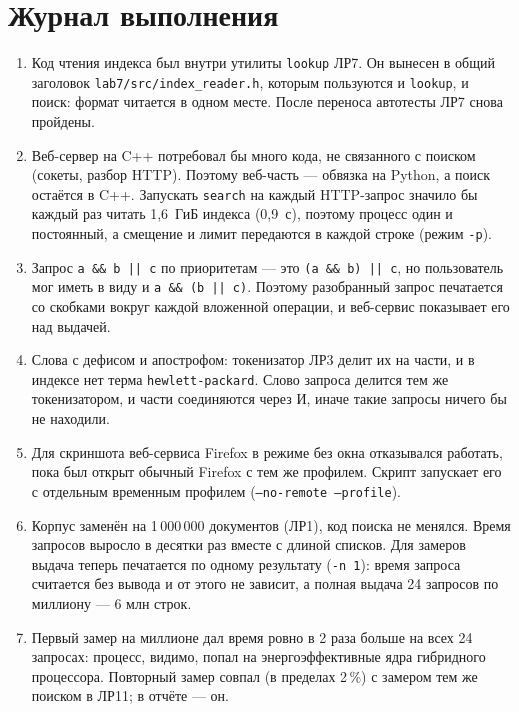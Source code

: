 \section{Журнал выполнения}
\begin{enumerate}
    \item Код чтения индекса был внутри утилиты \texttt{lookup} ЛР7. Он вынесен в общий заголовок \texttt{lab7/src/index\_reader.h}, которым пользуются и \texttt{lookup}, и поиск: формат читается в одном месте. После переноса автотесты ЛР7 снова пройдены.
    \item Веб-сервер на C++ потребовал бы много кода, не связанного с поиском (сокеты, разбор HTTP). Поэтому веб-часть --- обвязка на Python, а поиск остаётся в C++. Запускать \texttt{search} на каждый HTTP-запрос значило бы каждый раз читать 1,6~ГиБ индекса (0,9~с), поэтому процесс один и постоянный, а смещение и лимит передаются в каждой строке (режим \texttt{-p}).
    \item Запрос \texttt{a \&\& b || c} по приоритетам --- это \texttt{(a \&\& b) || c}, но пользователь мог иметь в виду и \texttt{a \&\& (b || c)}. Поэтому разобранный запрос печатается со скобками вокруг каждой вложенной операции, и веб-сервис показывает его над выдачей.
    \item Слова с дефисом и апострофом: токенизатор ЛР3 делит их на части, и в индексе нет терма \texttt{hewlett-packard}. Слово запроса делится тем же токенизатором, и части соединяются через И, иначе такие запросы ничего бы не находили.
    \item Для скриншота веб-сервиса Firefox в режиме без окна отказывался работать, пока был открыт обычный Firefox с тем же профилем. Скрипт запускает его с отдельным временным профилем (\texttt{--no-remote --profile}).
    \item Корпус заменён на 1\,000\,000 документов (ЛР1), код поиска не менялся. Время запросов выросло в десятки раз вместе с длиной списков. Для замеров выдача теперь печатается по одному результату (\texttt{-n 1}): время запроса считается без вывода и от этого не зависит, а полная выдача 24 запросов по миллиону --- 6 млн строк.
    \item Первый замер на миллионе дал время ровно в 2 раза больше на всех 24 запросах: процесс, видимо, попал на энергоэффективные ядра гибридного процессора. Повторный замер совпал (в пределах 2\,\%) с замером тем же поиском в ЛР11; в отчёте --- он.
\end{enumerate}

